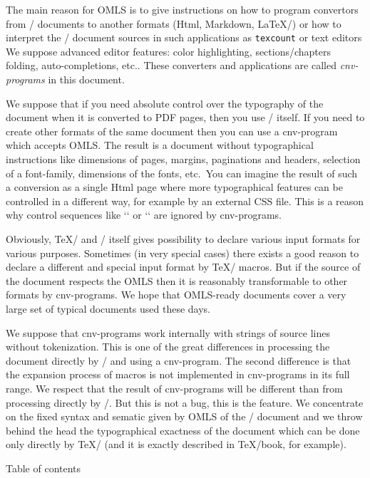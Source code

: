 The main reason for OMLS is to give instructions on how to program convertors
from \OpTeX/ documents to another formats (Html, Markdown, \LaTeX/) or how
to interpret the \OpTeX/ document sources in such applications as
{\tt texcount} or text editors\fnote
{We suppose advanced editor features: color highlighting, sections/chapters folding,
 auto-completions, etc.}.
These converters and applications are called {\it cnv-programs} in this document.

We suppose that if you need absolute control over the typography of the
document when it is converted to PDF pages, then you use \OpTeX/ itself. If
you need to create other formats of the same document then you can use a
cnv-program which accepts OMLS. The result is a document without
typographical instructions like dimensions of pages, margins, paginations
and headers, selection of a font-family, dimensions of the fonts, etc.\ You can
imagine the result of such a conversion as a single Html page where more
typographical features can be controlled in a different way, for example by
an external CSS file. This is a reason why control sequences like `\fontfam` or
`\margins` are ignored by cnv-programs.

Obviously, \TeX/ and \OpTeX/ itself gives possibility to declare various
input formats for various purposes. Sometimes (in very special cases) there
exists a good reason to declare a different and special input format by
\TeX/ macros. But if the source of the document respects the OMLS then it is
reasonably transformable to other formats by cnv-programs. We hope that
OMLS-ready documents cover a very large set of typical documents used these
days.

We suppose that cnv-programs work internally with strings of source lines
without tokenization. This is one of the great differences in processing the
document directly by \OpTeX/ and using a cnv-program. The second difference is
that the expansion process of macros is not implemented in cnv-programs in
its full range. We respect that the result of cnv-programs will be different
than from processing directly by \OpTeX/. But this is not a bug, this is
the feature. We concentrate on the fixed syntax and sematic given by OMLS of the
\OpTeX/ document and we throw behind the head the typographical
exactness of the document which can be done only directly by \TeX/ (and it is
exactly described in \TeX/book, for example).

\notoc\nonum\sec Table of contents

\maketoc
\endmulti
\vfil\break

